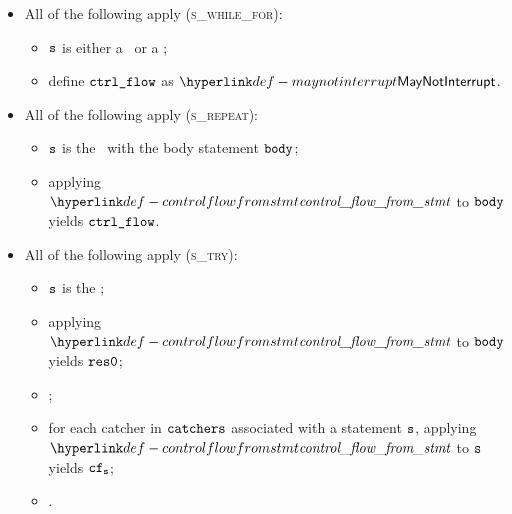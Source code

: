 \begin{itemize}
  \item All of the following apply (\textsc{s\_while\_for}):
  \begin{itemize}
    \item $\vs$ is either a \whilestatementterm\ or a \forstatementterm;
    \item define $\vctrlflow$ as $\maynotinterrupt$.
  \end{itemize}

  \item All of the following apply (\textsc{s\_repeat}):
  \begin{itemize}
    \item $\vs$ is the \repeatstatementterm\ with the body statement $\vbody$;
    \item applying $\controlflowfromstmt$ to $\vbody$ yields $\vctrlflow$.
  \end{itemize}

  \item All of the following apply (\textsc{s\_try}):
  \begin{itemize}
    \item $\vs$ is the \trystatement{$\vbody$}{\\ $\catchers$}{$\votherwiseopt$};
    \item applying $\controlflowfromstmt$ to $\vbody$ yields $\vreszero$;
    \item {};
    \item for each catcher in $\catchers$ associated with a statement $\vs$,
          applying \\
          $\controlflowfromstmt$ to $\vs$ yields $\vcf_\vs$;
    \item {}.
  \end{itemize}
\end{itemize}

\FormallyParagraph
\begin{mathpar}
\end{mathpar}

